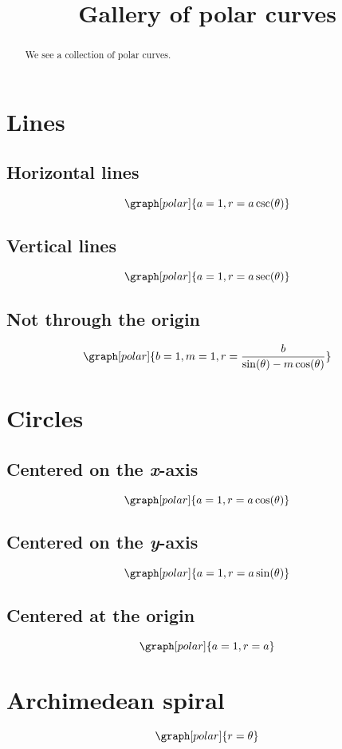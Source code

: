 \documentclass{ximera}
\title[Dig-In:]{Gallery of polar curves}
\begin{document}
\begin{abstract}
We see a collection of polar curves.
\end{abstract}
\maketitle

\section{Lines}

\subsection{Horizontal lines}
\[
\graph[polar]{a=1,r=a \csc(\theta)}
\]
\subsection{Vertical lines}
\[
\graph[polar]{a=1,r=a \sec(\theta)}
\]
\subsection{Not through the origin}
\[
\graph[polar]{b=1,m=1,r=\frac{b}{\sin(\theta)-m \cos(\theta)}}
\]

\section{Circles}

\subsection{Centered on the \textit{x}-axis}
\[
\graph[polar]{a=1, r=a \cos(\theta)}
\]

\subsection{Centered on the \textit{y}-axis}
\[
\graph[polar]{a=1,r=a \sin(\theta)}
\]

\subsection{Centered at the origin}
\[
\graph[polar]{a=1,r=a}
\]

\section{Archimedean spiral}
\[
\graph[polar]{r=\theta}
\]
\end{document}
